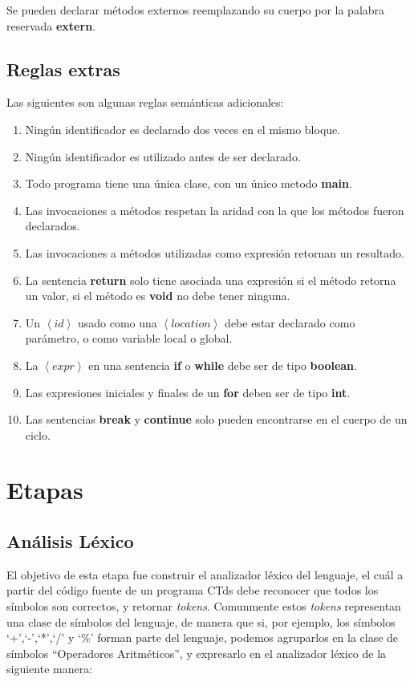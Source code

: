 \documentclass[11pt,a4paper]{article}
\begin{document}
Se pueden declarar métodos externos reemplazando su cuerpo por la palabra reservada \textbf{extern}.

\subsection{Reglas extras}
\label{extra}

Las siguientes son algunas reglas semánticas adicionales:
\begin{enumerate}
\item Ningún identificador es declarado dos veces en el mismo bloque.
\item Ningún identificador es utilizado antes de ser declarado.
\item Todo programa tiene una única clase, con un único metodo \textbf{main}.
\item Las invocaciones a métodos respetan la aridad con la que los métodos fueron declarados.
\item Las invocaciones a métodos utilizadas como expresión retornan un resultado.
\item La sentencia \textbf{return} solo tiene asociada una expresión si el método retorna un valor, si el método es \textbf{void} no debe tener ninguna.
\item Un $\left\langle id \right\rangle$ usado como una $\left\langle location \right\rangle$ debe estar declarado como parámetro, o como variable local o global.
\item La $\left\langle expr \right\rangle$ en una sentencia \textbf{if} o \textbf{while} debe ser de tipo \textbf{boolean}.
\item Las expresiones iniciales y finales de un \textbf{for} deben ser de tipo \textbf{int}.
\item Las sentencias \textbf{break} y \textbf{continue} solo pueden encontrarse en el cuerpo de un ciclo.
\end{enumerate} 
\section{Etapas} 
\label{sec:etapas}

\subsection{Análisis Léxico} 
\label{subsec:lexico}

El objetivo de esta etapa fue construir el analizador léxico del lenguaje, el cuál a partir del código fuente de un programa CTds debe reconocer que todos los símbolos son correctos, y retornar \textit{tokens}. Comunmente estos \textit{tokens} representan una clase de símbolos del lenguaje, de manera que si, por ejemplo, los símbolos `+',`-',`*',`/' y `\%' forman parte del lenguaje, podemos agruparlos en la clase de símbolos ``Operadores Aritméticos'', y expresarlo en el analizador léxico de la siguiente manera:
\\
\end{document}

